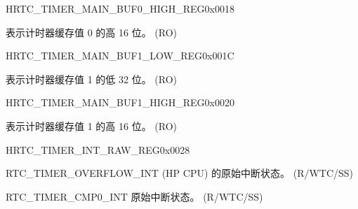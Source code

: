 \begin{register}{H}{RTC\_TIMER\_MAIN\_BUF0\_HIGH\_REG}{0x0018}\label{regdesc:RTCTIMERMAINBUF0HIGHREG}
%
%
\regnewline%
\begin{regdesc}\begin{reglist}
\label{fielddesc:RTCTIMERMAINTIMERBUF0HIGH}\item [RTC\_TIMER\_MAIN\_TIMER\_BUF0\_HIGH] 表示计时器缓存值 0 的高 16 位。 (RO)
\end{reglist}\end{regdesc}
\end{register}


\begin{register}{H}{RTC\_TIMER\_MAIN\_BUF1\_LOW\_REG}{0x001C}\label{regdesc:RTCTIMERMAINBUF1LOWREG}
%
\regnewline%
\begin{regdesc}\begin{reglist}
\label{fielddesc:RTCTIMERMAINTIMERBUF1LOW}\item [RTC\_TIMER\_MAIN\_TIMER\_BUF1\_LOW] 表示计时器缓存值 1 的低 32 位。 (RO)
\end{reglist}\end{regdesc}
\end{register}


\begin{register}{H}{RTC\_TIMER\_MAIN\_BUF1\_HIGH\_REG}{0x0020}\label{regdesc:RTCTIMERMAINBUF1HIGHREG}
%
%
\regnewline%
\begin{regdesc}\begin{reglist}
\label{fielddesc:RTCTIMERMAINTIMERBUF1HIGH}\item [RTC\_TIMER\_MAIN\_TIMER\_BUF1\_HIGH] 表示计时器缓存值 1 的高 16 位。 (RO)
\end{reglist}\end{regdesc}
\end{register}


\begin{register}{H}{RTC\_TIMER\_INT\_RAW\_REG}{0x0028}\label{regdesc:RTCTIMERINTRAWREG}
%
%
%
\regnewline%
\begin{regdesc}\begin{reglist}
\label{fielddesc:RTCTIMEROVERFLOWRAW}\item [RTC\_TIMER\_OVERFLOW\_RAW] RTC\_TIMER\_OVERFLOW\_INT (HP CPU) 的原始中断状态。 (R/WTC/SS)
\label{fielddesc:RTCTIMERSOCWAKEUPINTRAW}\item [RTC\_TIMER\_SOC\_WAKEUP\_INT\_RAW] RTC\_TIMER\_CMP0\_INT 原始中断状态。 (R/WTC/SS)
\end{reglist}\end{regdesc}
\end{register}


